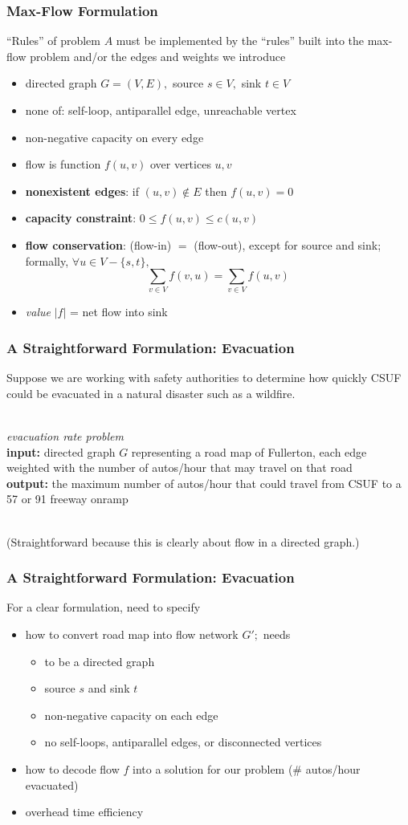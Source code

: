 \documentclass{beamer}
\newcommand{\stanza}{ \\~\ }
\begin{document}
\begin{frame} \frametitle{Max-Flow Formulation}
``Rules'' of problem $A$ must be implemented by the ``rules'' built
  into the max-flow problem and/or the edges and weights we introduce
\begin{itemize}
  \item directed graph $G=(V, E),$ source $s \in V,$ sink $t \in V$
  \item none of: self-loop, antiparallel edge, unreachable vertex
  \item non-negative capacity on every edge
  \item flow is function $f(u, v)$ over vertices $u, v$
  \item \textbf{nonexistent edges}: if $(u, v) \notin E$ then $f(u, v) = 0$
  \item \textbf{capacity constraint}: $0 \leq f(u, v) \leq c(u, v)$
  \item \textbf{flow conservation}: (flow-in) $=$ (flow-out), except for source and
    sink; formally, $\forall u \in V - \{s, t\},$
    \[ \sum_{v \in V} f(v, u) = \sum_{v \in V} f(u, v) \]
  \item \emph{value} $|f|$ = net flow into sink
  \end{itemize}
\end{frame}

\begin{frame} \frametitle{A Straightforward Formulation: Evacuation}
Suppose we are working with safety authorities to determine how quickly CSUF
could be evacuated in a natural disaster such as a wildfire. \stanza

\emph{evacuation rate problem} \\
\textbf{input:} directed graph $G$ representing a road map of Fullerton, each edge
weighted with the number of autos/hour that may travel on that road \\
\textbf{output:} the maximum number of autos/hour that could travel from CSUF to
a 57 or 91 freeway onramp \stanza

(Straightforward because this is clearly about flow in a directed graph.)
\end{frame}

\begin{frame} \frametitle{A Straightforward Formulation: Evacuation}
For a clear formulation, need to specify
\begin{itemize}
  \item how to convert road map into flow network $G';$ needs
  \begin{itemize}
    \item to be a directed graph
    \item source $s$ and sink $t$
    \item non-negative capacity on each edge
    \item no self-loops, antiparallel edges, or disconnected vertices
  \end{itemize}
  \item how to decode flow $f$ into a solution for our problem (\# autos/hour evacuated)
  \item overhead time efficiency
\end{itemize}
\end{frame}
\end{document}
